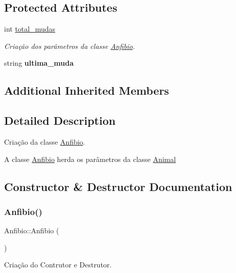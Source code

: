 \subsection*{Protected Attributes}
\begin{DoxyCompactItemize}
\item 
int \mbox{\hyperlink{class_anfibio_a46768866ac5b9ab108219631ea4cbfc6}{total\+\_\+mudas}}
\begin{DoxyCompactList}\small\item\em Criação dos parâmetros da classe \mbox{\hyperlink{class_anfibio}{Anfibio}}. \end{DoxyCompactList}\item 
\mbox{\label{class_anfibio_a1aad121d75a27621d2dc8be39cf14123}} 
string {\bfseries ultima\+\_\+muda}
\end{DoxyCompactItemize}
\subsection*{Additional Inherited Members}


\subsection{Detailed Description}
Criação da classe \mbox{\hyperlink{class_anfibio}{Anfibio}}. 

A classe \mbox{\hyperlink{class_anfibio}{Anfibio}} herda os parâmetros da classe \mbox{\hyperlink{class_animal}{Animal}} 

\subsection{Constructor \& Destructor Documentation}
\mbox{\label{class_anfibio_a91fd9b91b9124ab41ea9e9c9bb013476}} 
\subsubsection{\texorpdfstring{Anfibio()}{Anfibio()}}
{\footnotesize\ttfamily Anfibio\+::\+Anfibio (\begin{DoxyParamCaption}{ }\end{DoxyParamCaption})}



Criação do Contrutor e Destrutor. 

